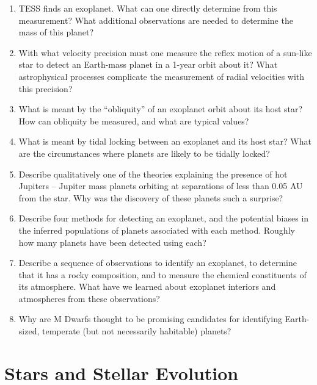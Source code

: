 \documentclass[11pt, oneside]{book}
\begin{document}
\begin{enumerate}[start=8, itemsep=0.4cm]
    \item TESS finds an exoplanet. What can one directly determine from this measurement? What additional observations are needed to determine the mass of this planet?
    \item With what velocity precision must one measure the reflex motion of a sun-like star to detect an Earth-mass planet in a 1-year orbit about it? What astrophysical processes complicate the measurement of radial velocities with this precision?
    \item What is meant by the ``obliquity'' of an exoplanet orbit about its host star? How can obliquity be measured, and what are typical values?
    \item What is meant by tidal locking between an exoplanet and its host star? What are the circumstances where planets are likely to be tidally locked?
    \item Describe qualitatively one of the theories explaining the presence of hot Jupiters -- Jupiter mass planets orbiting at separations of less than 0.05 AU from the star. Why was the discovery of these planets such a surprise?
    \item Describe four methods for detecting an exoplanet, and the potential biases in the inferred populations of planets associated with each method. Roughly how many planets have been detected using each?
    \item Describe a sequence of observations to identify an exoplanet, to determine that it has a rocky composition, and to measure the chemical constituents of its atmosphere. What have we learned about exoplanet interiors and atmospheres from these observations?
    \item Why are M Dwarfs thought to be promising candidates for identifying Earth-sized, temperate (but not necessarily habitable) planets?
\end{enumerate}

\section{Stars and Stellar Evolution}
\end{document}
